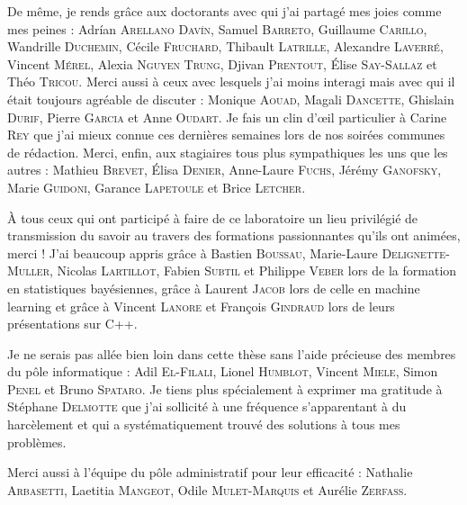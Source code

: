 De même, je rends gr\^ace aux doctorants avec qui j'ai partagé mes joies comme mes peines :
Adr\'ian \textsc{Arellano Dav\'in}, 
Samuel \textsc{Barreto},
Guillaume \textsc{Carillo},
Wandrille \textsc{Duchemin},
Cécile \textsc{Fruchard},
Thibault \textsc{Latrille},
Alexandre \textsc{Laverré},
Vincent \textsc{Mérel},
Alexia \textsc{Nguyen Trung},
Djivan \textsc{Prentout},
\'Elise \textsc{Say-Sallaz} et
Théo \textsc{Tricou}.
Merci aussi à ceux avec lesquels j'ai moins interagi mais avec qui il était toujours agréable de discuter : 
Monique \textsc{Aouad},
Magali \textsc{Dancette},
Ghislain \textsc{Durif},
Pierre \textsc{Garcia} et Anne \textsc{Oudart}.
Je fais un clin d'œil particulier à Carine \textsc{Rey} que j'ai mieux connue ces dernières semaines lors de nos soirées communes de rédaction.
Merci, enfin, aux stagiaires tous plus sympathiques les uns que les autres : Mathieu \textsc{Brevet}, \'Elisa \textsc{Denier}, Anne-Laure \textsc{Fuchs}, Jérémy \textsc{Ganofsky}, Marie \textsc{Guidoni}, Garance \textsc{Lapetoule} et Brice \textsc{Letcher}.

\`A tous ceux qui ont participé à faire de ce laboratoire un lieu privilégié de transmission du savoir au travers des formations passionnantes qu'ils ont animées, merci ! J'ai beaucoup appris gr\^ace à
Bastien \textsc{Boussau}, Marie-Laure \textsc{Delignette-Muller}, Nicolas \textsc{Lartillot}, Fabien \textsc{Subtil} et Philippe \textsc{Veber} lors de la formation en statistiques bayésiennes, gr\^ace à Laurent \textsc{Jacob} lors de celle en machine learning et gr\^ace à Vincent \textsc{Lanore} et François \textsc{Gindraud} lors de leurs présentations sur C++.



Je ne serais pas allée bien loin dans cette thèse sans l'aide précieuse des membres du pôle informatique : 
Adil \textsc{El-Filali},
Lionel \textsc{Humblot},
Vincent \textsc{Miele},
Simon \textsc{Penel} et
Bruno \textsc{Spataro}.
Je tiens plus spécialement à exprimer ma gratitude à Stéphane \textsc{Delmotte} que j'ai sollicité à une fréquence s'apparentant à du harcèlement et qui a systématiquement trouvé des solutions à tous mes problèmes.

Merci aussi à l'équipe du pôle administratif pour leur efficacité : 
Nathalie \textsc{Arbasetti},
Laetitia \textsc{Mangeot},
Odile \textsc{Mulet-Marquis} et
Aurélie \textsc{Zerfass}.

